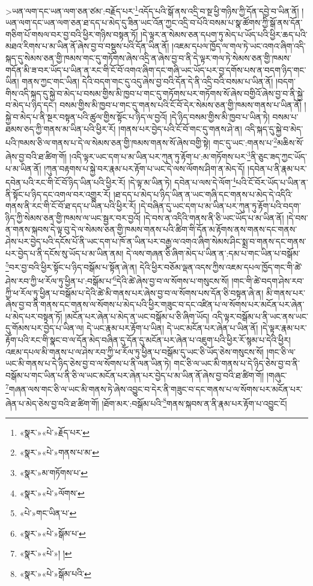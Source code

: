  >ཡན་ལག་དང་ཡན་ལག་ཅན་ཙམ་:བརྗོད་པར་\footnote{«སྣར་»«པེ་»རྗོད་པར་}འདོད་པའི་སྒོ་ནས་འདྲི་བ་སྔ་ཕྱི་གཉིས་ཀྱི་དོན་དབྱེ་བ་ཡིན་ནོ། །ཡན་ལག་དང་ཡན་ལག་ཅན་ཐ་དད་པ་མེད་དུ་ཟིན་ཡང་འོན་ཀྱང་འདྲི་བ་པོའི་བསམ་པ་སྣ་ཚོགས་ཀྱི་སྒོ་ནས་དོན་གཅིག་པོ་གསལ་བར་བྱ་བའི་ཕྱིར་གཉིས་བསྟན་ཏོ། །དེ་ལྟར་ན་སེམས་ཅན་དཔག་ཏུ་མེད་པ་ཡོད་པའི་ཕྱིར་ཆད་པའི་མཐའ་རིགས་པ་མ་ཡིན་ནོ་ཞེས་བྱ་བ་བསྡུས་པའི་དོན་ཡིན་ནོ། །འཇམ་དཔལ་ཁྱོད་ལ་གལ་ཏེ་ཡང་འགའ་ཞིག་འདི་སྐད་དུ་སེམས་ཅན་གྱི་ཁམས་གང་དུ་གཏོགས་ཞེས་འདྲི་ན་ཞེས་བྱ་བ་ནི་དེ་ལྟར་གལ་ཏེ་སེམས་ཅན་གྱི་ཁམས་གདོན་མི་ཟ་བར་ཡོད་པ་ཡིན་ན་རང་གི་ངོ་བོ་འགའ་ཞིག་དང་གཞི་ཡང་ཡོད་པར་བྱ་དགོས་པས་ན་བདག་ཉིད་གང་ཡིན། གནས་ཀྱང་གང་ཡིན། དེའི་བདག་གང་དུ་འདུ་ཞེས་བྱ་བའི་དོན་དེ་ནི་འདྲི་བའི་བསམ་པ་ཡིན་ནོ། །བདག་གིས་འདི་སྐད་དུ་སྐྱེ་བ་མེད་པ་བསམ་གྱིས་མི་ཁྱབ་པ་གང་དུ་གཏོགས་པར་གཏོགས་སོ་ཞེས་བགྱིའོ་ཞེས་བྱ་བ་ནི་སྐྱེ་བ་མེད་པ་ཉིད་དང་། བསམ་གྱིས་མི་ཁྱབ་པ་གང་དུ་གནས་པའི་ངོ་བོ་དེར་སེམས་ཅན་གྱི་ཁམས་གནས་པ་ཡིན་ནོ། །སྐྱེ་བ་མེད་པ་ནི་སྔར་བསྟན་པའི་ཚུལ་གྱིས་སྟོང་པ་ཉིད་ལ་བྱའོ། །དེ་ཉིད་བསམ་གྱིས་མི་ཁྱབ་པ་ཡིན་ཏེ། བསམ་པ་ཐམས་ཅད་ཀྱི་གནས་མ་ཡིན་པའི་ཕྱིར་རོ། །གནས་པར་བྱེད་པའི་ངོ་བོ་གང་དུ་གནས་ཤེ་ན། འདི་སྐད་དུ་སྐྱེ་བ་མེད་པའི་ཁམས་ཅི་ལ་གནས་པ་དེ་ལ་སེམས་ཅན་གྱི་ཁམས་གནས་སོ་ཞེས་བགྱི་སྟེ། གང་དུ་ཡང་:གནས་པ་\footnote{«སྣར་»«པེ་»གནས་པ་མ་}མཆིས་སོ་ཞེས་བྱ་བའི་ཐ་ཚིག་གོ། །འདི་ལྟར་ཡང་དག་པ་མ་ཡིན་པར་ཀུན་ཏུ་རྟོག་པ་:མ་གཏོགས་པར་\footnote{«སྣར་»མ་གཏོགས་པ་}ནི་ཅུང་ཟད་ཀྱང་ཡོད་པ་མ་ཡིན་ནོ། །ཀུན་བརྟགས་པ་སྐྱེ་བར་རྣམ་པར་རྟོག་པ་ཡང་དེ་ལས་ལོགས་ཤིག་ན་མེད་དོ། །དབེན་པ་ནི་རྣམ་པར་དབེན་པའི་རང་གི་ངོ་བོ་ཉིད་ཡིན་པའི་ཕྱིར་རོ། །དེ་ལྟ་མ་ཡིན་ཏེ། དབེན་པ་ལས་དེ་ལོག་\footnote{«སྣར་»«པེ་»ལོགས་}པའི་ངོ་བོར་ཡོད་པ་ཡིན་ན་ནི་སྟོང་པ་ཉིད་དང་འགལ་བར་འགྱུར་རོ། །ཐ་དད་པ་མེད་པ་ཉིད་ཡིན་ན་ཡང་གཞི་དང་གནས་པ་མེད་དེ་འདིའི་གནས་ནི་རང་གི་ངོ་བོ་ཐ་དད་པ་ཡིན་པའི་ཕྱིར་རོ། །དེ་བཞིན་དུ་ཡང་དག་པ་མ་ཡིན་པར་ཀུན་ཏུ་རྟོག་པའི་བདག་ཉིད་ཀྱི་སེམས་ཅན་གྱི་ཁམས་ལ་ཡང་སྦྱར་བར་བྱའོ། །དེ་བས་ན་འདིའི་གནས་ནི་ཅི་ཡང་ཡོད་པ་མ་ཡིན་ནོ། །དེ་བས་ན་གནས་སྐབས་དེ་ལྟ་བུ་དེ་ལ་སེམས་ཅན་གྱི་ཁམས་གནས་པའི་ཚིག་གི་དོན་མ་རྟོགས་ནས་གནས་དང་གནས་ཤེས་པར་བྱེད་པའི་དངོས་པོ་ནི་ཡང་དག་པ་ཁོ་ན་ཡིན་པར་བརྒྱ་ལ་འགའ་ཞིག་སེམས་ཤིང་སྨྲ་བ་གནས་དང་གནས་པར་བྱེད་པ་ནི་དངོས་སུ་ཡོད་པ་མ་ཡིན་ནམ། དེ་ལས་གཞན་ཅི་ཞིག་མེད་པ་ཡིན་ན་:དམ་པ་གང་ཡིན་པ་བསྒོམ་\footnote{«པེ་»གང་ཡིན་པ་}བར་བྱ་བའི་ཕྱིར་སྟོང་པ་ཉིད་བསྒོམ་པ་སྟོན་ཞེ་ན། དེའི་ཕྱིར་བཅོམ་ལྡན་འདས་ཀྱིས་འཇམ་དཔལ་ཁྱོད་གང་གི་ཚེ་ཤེས་རབ་ཀྱི་ཕ་རོལ་ཏུ་ཕྱིན་པ་:བསྒོམ་པ་\footnote{«སྣར་»«པེ་»སྒོམ་པ་}དེའི་ཚེ་ཞེས་བྱ་བ་ལ་སོགས་པ་གསུངས་སོ། །གང་གི་ཚེ་བདག་ཤེས་རབ་ཀྱི་ཕ་རོལ་ཏུ་ཕྱིན་པ་བསྒོམ་པ་དེའི་ཚེ་མི་གནས་པར་ཞེས་བྱ་བ་ལ་སོགས་པས་དོན་ཅི་བསྟན་ཞེ་ན། མི་གནས་པར་ཞེས་བྱ་བ་ནི་གནས་དང་གནས་ལ་སོགས་པ་མེད་པའི་ཕྱིར་གཟུང་བ་དང་འཛིན་པ་ལ་སོགས་པར་མངོན་པར་ཞེན་པ་མེད་པར་བསྟན་ཏོ། །མངོན་པར་ཞེན་པ་མེད་ན་ཡང་བསྒོམ་པ་ཅི་ཞིག་ཡོད། འདི་ལྟར་བསྒོམ་པ་ནི་ཡང་ནས་ཡང་དུ་གོམས་པར་བྱེད་པ་ཡིན་ལ། དེ་ཡང་རྣམ་པར་རྟོག་པ་ཡིན། དེ་ཡང་མངོན་པར་ཞེན་པ་ཡིན་ནོ། །དེ་ལྟར་རྣམ་པར་རྟོག་པའི་རང་གི་སྣང་བ་ལ་དོན་མེད་བཞིན་དུ་དོན་དུ་མངོན་པར་ཞེན་པ་འཇུག་པའི་ཕྱིར་རོ་སྙམ་པ་དེའི་ཕྱིར། འཇམ་དཔལ་མི་གནས་པ་ལ་ཤེས་རབ་ཀྱི་ཕ་རོལ་ཏུ་ཕྱིན་པ་བསྒོམ་དུ་ཡང་ཅི་ཡོད་ཅེས་གསུངས་སོ། །གང་ཅི་ལ་ཡང་མི་གནས་པ་དེ་ཉིད་ཅེས་བྱ་བ་ལ་སོགས་པ་ནི་ལན་ཡིན་ཏེ། གང་ཅི་ལ་ཡང་མི་གནས་པ་དེ་ཉིད་ཅེས་བྱ་བ་ནི་བསྒོམ་པ་གང་ཡིན་པ་ནི་ཅི་ལ་ཡང་མངོན་པར་ཞེན་པར་བྱེད་པ་མ་ཡིན་ནོ་ཞེས་བྱ་བའི་ཐ་ཚིག་གོ། །གཞུང་\footnote{«སྣར་»«པེ་»། །}གཞན་ལས་གང་ཅི་ལ་ཡང་མི་གནས་ཏེ་ཞེས་འབྱུང་བ་དེར་ནི་གཟུང་བ་དང་གནས་པ་ལ་སོགས་པར་མངོན་པར་ཞེན་པ་མེད་ཅེས་བྱ་བའི་ཐ་ཚིག་གོ། །ཐོག་མར་:བསྒོམ་པའི་\footnote{«སྣར་»«པེ་»སྒོམ་པའི་}གནས་སྐབས་ན་ནི་རྣམ་པར་རྟོག་པ་འབྱུང་ངོ། 